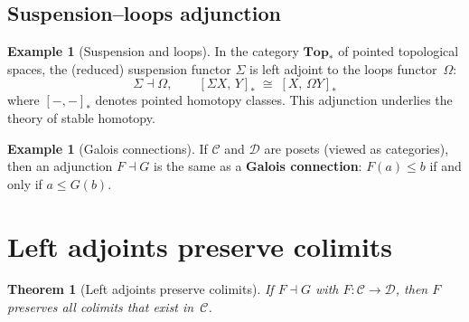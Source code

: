 \documentclass[a4paper,12pt]{book}
\newcommand{\Top}{\mathbf{Top}}
\theoremstyle{definition}
\newtheorem{example}[definition]{Example}
\theoremstyle{plain}
\newtheorem{theorem}[definition]{Theorem}
\theoremstyle{remark}
\begin{document}
\subsection{Suspension--loops adjunction}

\begin{example}[Suspension and loops]\label{ex:suspension-loops}
In the category $\Top_*$ of pointed topological spaces, the
(reduced) suspension functor $\Sigma$ is left adjoint to the
loops functor~$\Omega$:
\[
    \Sigma \dashv \Omega, \qquad
    [\Sigma X,\, Y]_* \;\cong\; [X,\,\Omega Y]_*
\]
where $[-,-]_*$ denotes pointed homotopy classes.
This adjunction underlies the theory of stable homotopy.
\end{example}

\begin{example}[Galois connections]\label{ex:galois-connection}
If $\mathcal{C}$ and $\mathcal{D}$ are posets (viewed as categories),
then an adjunction $F\dashv G$ is the same as a \textbf{Galois connection}:
$F(a)\leq b$ if and only if $a\leq G(b)$.
\end{example}


\section{Left adjoints preserve colimits}\label{sec:ladj-colim}

\begin{theorem}[Left adjoints preserve colimits]%
\label{thm:ladj-preserve-colim}
If $F\dashv G$ with $F\colon\mathcal{C}\to\mathcal{D}$,
then $F$ preserves all colimits that exist in~$\mathcal{C}$.
\end{theorem}
\end{document}

